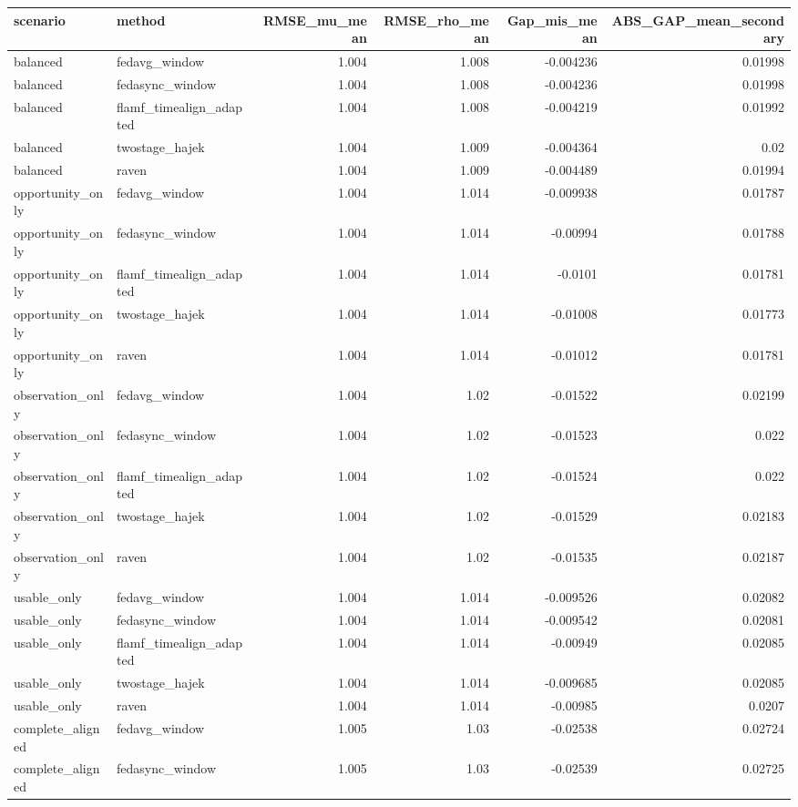 \begin{tabular}{llrrrr}
\toprule
scenario & method & RMSE_mu_mean & RMSE_rho_mean & Gap_mis_mean & ABS_GAP_mean_secondary \\
\midrule
balanced & fedavg_window & 1.004 & 1.008 & -0.004236 & 0.01998 \\
balanced & fedasync_window & 1.004 & 1.008 & -0.004236 & 0.01998 \\
balanced & flamf_timealign_adapted & 1.004 & 1.008 & -0.004219 & 0.01992 \\
balanced & twostage_hajek & 1.004 & 1.009 & -0.004364 & 0.02 \\
balanced & raven & 1.004 & 1.009 & -0.004489 & 0.01994 \\
opportunity_only & fedavg_window & 1.004 & 1.014 & -0.009938 & 0.01787 \\
opportunity_only & fedasync_window & 1.004 & 1.014 & -0.00994 & 0.01788 \\
opportunity_only & flamf_timealign_adapted & 1.004 & 1.014 & -0.0101 & 0.01781 \\
opportunity_only & twostage_hajek & 1.004 & 1.014 & -0.01008 & 0.01773 \\
opportunity_only & raven & 1.004 & 1.014 & -0.01012 & 0.01781 \\
observation_only & fedavg_window & 1.004 & 1.02 & -0.01522 & 0.02199 \\
observation_only & fedasync_window & 1.004 & 1.02 & -0.01523 & 0.022 \\
observation_only & flamf_timealign_adapted & 1.004 & 1.02 & -0.01524 & 0.022 \\
observation_only & twostage_hajek & 1.004 & 1.02 & -0.01529 & 0.02183 \\
observation_only & raven & 1.004 & 1.02 & -0.01535 & 0.02187 \\
usable_only & fedavg_window & 1.004 & 1.014 & -0.009526 & 0.02082 \\
usable_only & fedasync_window & 1.004 & 1.014 & -0.009542 & 0.02081 \\
usable_only & flamf_timealign_adapted & 1.004 & 1.014 & -0.00949 & 0.02085 \\
usable_only & twostage_hajek & 1.004 & 1.014 & -0.009685 & 0.02085 \\
usable_only & raven & 1.004 & 1.014 & -0.00985 & 0.0207 \\
complete_aligned & fedavg_window & 1.005 & 1.03 & -0.02538 & 0.02724 \\
complete_aligned & fedasync_window & 1.005 & 1.03 & -0.02539 & 0.02725 \\

\end{tabular}

